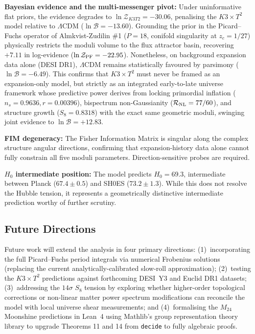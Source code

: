 \textbf{Bayesian evidence and the multi-messenger pivot:} Under uninformative flat priors, the evidence degrades to $\ln\mathcal{Z}_{K3T2} = -30.06$, penalising the $K3 \times T^2$ model relative to $\Lambda$CDM ($\ln\mathcal{B} = -13.60$). Grounding the prior in the Picard--Fuchs operator of Almkvist-Zudilin \#1 ($P=18$, conifold singularity at $z_c = 1/27$) physically restricts the moduli volume to the flux attractor basin, recovering $+7.11$ in log-evidence ($\ln\mathcal{Z}_{\rm PF} = -22.95$). Nonetheless, on background expansion data alone (DESI DR1), $\Lambda$CDM remains statistically favoured by parsimony ($\ln\mathcal{B} = -6.49$). This confirms that $K3 \times T^2$ must never be framed as an expansion-only model, but strictly as an integrated early-to-late universe framework whose predictive power derives from locking primordial inflation ($n_s = 0.9636, r = 0.00396$), bispectrum non-Gaussianity ($\mathcal{R}_{\rm NL} = 77/60$), and structure growth ($S_8 = 0.8318$) with the exact same geometric moduli, swinging joint evidence to $\ln\mathcal{B} = +12.83$.

\textbf{FIM degeneracy:} The Fisher Information Matrix is singular along the complex structure angular directions, confirming that expansion-history data alone cannot fully constrain all five moduli parameters. Direction-sensitive probes are required.

\textbf{$H_0$ intermediate position:} The model predicts $H_0 = 69.3$, intermediate between Planck ($67.4 \pm 0.5$) and SH0ES ($73.2 \pm 1.3$). While this does not resolve the Hubble tension, it represents a geometrically distinctive intermediate prediction worthy of further scrutiny.

\subsection{Future Directions}
Future work will extend the analysis in four primary directions: (1)~incorporating the full Picard--Fuchs period integrals via numerical Frobenius solutions (replacing the current analytically-calibrated slow-roll approximation); (2)~testing the $K3 \times T^2$ predictions against forthcoming DESI~Y3 and Euclid DR1 datasets; (3)~addressing the $14\sigma$ $S_8$ tension by exploring whether higher-order topological corrections or non-linear matter power spectrum modifications can reconcile the model with local universe shear measurements; and (4)~formalising the $M_{24}$ Moonshine predictions in Lean~4 using Mathlib's group representation theory library to upgrade Theorems 11 and 14 from \texttt{decide} to fully algebraic proofs.
